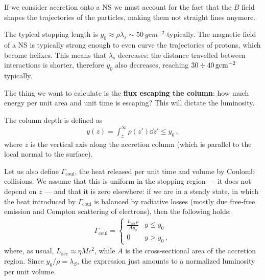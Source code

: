 \documentclass[main.tex]{subfiles}
\begin{document}

If we consider accretion onto a NS we must account for the fact that the \(B\) field shapes the trajectories of the particles, making them not straight lines anymore. 

The typical stopping length is \(y_0 \approx \rho \lambda _s \sim \SI{50}{g cm^{-2}}\) typically. 
The magnetic field of a NS is typically strong enough to even curve the trajectories of protons, which become helixes. This means that \(\lambda _s\) decreases: the distance travelled between interactions is shorter, therefore \(y_0\) also decreases, reaching \(30 \divisionsymbol \SI{40}{g cm^{-2}}\) typically. 

The thing we want to calculate is the \textbf{flux escaping the column}: how much energy per unit area and unit time is escaping? This will dictate the luminosity. 

The column depth is defined as 
%
\begin{align}
y(z) = \int_{z}^{\infty } \rho (z' ) \dd{z'} \leq y_0 
\,,
\end{align}
%
where \(z\) is the vertical axis along the accretion column (which is parallel to the local normal to the surface). 

Let us also define \(\Gamma _{\text{coul}}\), the heat released per unit time and volume by Coulomb collisions. We assume that this is uniform in the stopping region --- it does not depend on \(z\) --- and that it is zero elsewhere: if we are in a steady state, in which the heat introduced by \(\Gamma _{\text{coul}}\) is balanced by radiative losses (mostly due free-free emission and Compton scattering of electrons), then the following holds:
%
\begin{align}
\Gamma _{\text{coul}} = \begin{cases}
    \frac{L _{\text{acc}} \rho }{A y_0 } & y \leq y_0   \\
    0 & y > y_0 
\,,
\end{cases}
\end{align}
%
where, as usual, \(L _{\text{acc}} \approx \eta \dot{M} c^2\), while \(A\) is the cross-sectional area of the accretion region. Since \(y_0 / \rho = \lambda _S\), the expression just amounts to a normalized luminosity per unit volume.  
\end{document}
